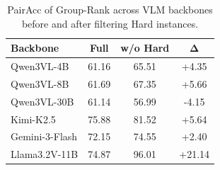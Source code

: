\begin{table}[t]
\centering
\small
\setlength{\tabcolsep}{5pt}
\renewcommand{\arraystretch}{1.05}
\begin{tabular}{lccc}
\toprule
\textbf{Backbone} & \textbf{Full} & \textbf{w/o Hard} & $\boldsymbol{\Delta}$ \\
\midrule
Qwen3VL-4B        & 61.16 & 65.51 & +4.35 \\
Qwen3VL-8B        & 61.69 & 67.35 & +5.66 \\
Qwen3VL-30B       & 61.14 & 56.99 & -4.15 \\
Kimi-K2.5         & 75.88 & 81.52 & +5.64 \\
Gemini-3-Flash    & 72.15 & 74.55 & +2.40 \\
Llama3.2V-11B     & 74.87 & 96.01 & +21.14 \\
\bottomrule
\end{tabular}
\caption{PairAcc of Group-Rank across VLM backbones before and after filtering Hard instances.}
\label{tab:group_rank_without_hard}
\end{table}
